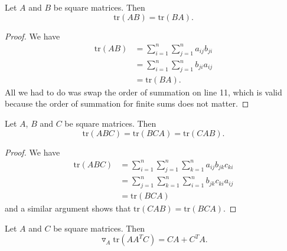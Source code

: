 \documentclass{article}
\begin{document}
\clearpage

\begin{theorem}
    Let $A$ and $B$ be square matrices. Then
    \begin{equation}
        \mathrm{tr}(AB) = \mathrm{tr}(BA).
    \end{equation}
\end{theorem}

\begin{proof}
    We have
    \begin{align}
        \mathrm{tr}(AB) &= \sum_{i=1}^n \sum_{j=1}^n a_{ij} b_{ji} \\
        &= \sum_{i=1}^n \sum_{j=1}^n b_{ji} a_{ij} \\
        &= \mathrm{tr}(BA).
    \end{align}
All we had to do was swap the order of summation on line 11, which is valid because the order of
summation for finite sums does not matter.
\end{proof}

\begin{theorem}
    Let $A$, $B$ and $C$ be square matrices. Then
    \begin{equation}
        \mathrm{tr}(ABC) = \mathrm{tr}(BCA) = \mathrm{tr}(CAB).
    \end{equation}
\end{theorem}

\begin{proof}
    We have
    \begin{align}
        \mathrm{tr}(ABC) &= \sum_{i=1}^n \sum_{j=1}^n \sum_{k=1}^n a_{ij} b_{jk} c_{ki} \\
        &= \sum_{j=1}^n \sum_{k=1}^n \sum_{i=1}^n b_{jk} c_{ki} a_{ij} \\
        &= \mathrm{tr}(BCA) 
    \end{align}
and a similar argument shows that $\mathrm{tr}(CAB) = \mathrm{tr}(BCA)$. 
\end{proof}

\begin{theorem}
    Let $A$ and $C$ be square matrices. Then
    \begin{equation}
        \triangledown_A \mathrm{tr}(A A^T C) = CA + C^TA.
    \end{equation}
\end{theorem}
\end{document}
